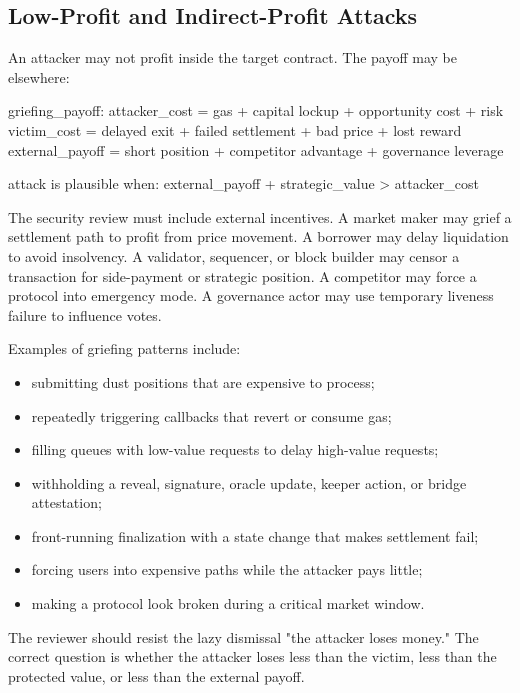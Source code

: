 \subsection{Low-Profit and Indirect-Profit Attacks}

An attacker may not profit inside the target contract. The payoff may be elsewhere:

\begin{codeblock}
griefing_payoff:
    attacker_cost = gas + capital lockup + opportunity cost + risk
    victim_cost = delayed exit + failed settlement + bad price + lost reward
    external_payoff = short position + competitor advantage + governance leverage

    attack is plausible when:
        external_payoff + strategic_value > attacker_cost
\end{codeblock}

The security review must include external incentives. A market maker may grief a settlement path to profit from price movement. A borrower may delay liquidation to avoid insolvency. A validator, sequencer, or block builder may censor a transaction for side-payment or strategic position. A competitor may force a protocol into emergency mode. A governance actor may use temporary liveness failure to influence votes.

Examples of griefing patterns include:

\begin{itemize}
\item submitting dust positions that are expensive to process;
\item repeatedly triggering callbacks that revert or consume gas;
\item filling queues with low-value requests to delay high-value requests;
\item withholding a reveal, signature, oracle update, keeper action, or bridge attestation;
\item front-running finalization with a state change that makes settlement fail;
\item forcing users into expensive paths while the attacker pays little;
\item making a protocol look broken during a critical market window.
\end{itemize}

The reviewer should resist the lazy dismissal "the attacker loses money." The correct question is whether the attacker loses less than the victim, less than the protected value, or less than the external payoff.

